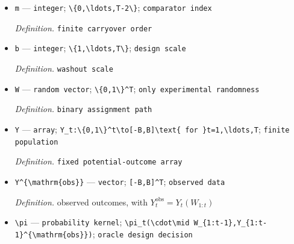 \documentclass{article}
\begin{document}
\begin{itemize}
  \par\smallskip\noindent\emph{Definition.} \texttt{polynomial historical-\allowbreak{}decay index}
  \item \texttt{m} --- \texttt{integer}; \texttt{\textbackslash{}\allowbreak{}\{0,\allowbreak{}\textbackslash{}\allowbreak{}ldots,\allowbreak{}T-\allowbreak{}2\textbackslash{}\allowbreak{}\}\allowbreak{}}; \texttt{comparator index}
  \par\smallskip\noindent\emph{Definition.} \texttt{finite carryover order}
  \item \texttt{b} --- \texttt{integer}; \texttt{\textbackslash{}\allowbreak{}\{1,\allowbreak{}\textbackslash{}\allowbreak{}ldots,\allowbreak{}T\textbackslash{}\allowbreak{}\}\allowbreak{}}; \texttt{design scale}
  \par\smallskip\noindent\emph{Definition.} \texttt{washout scale}
  \item \texttt{W} --- \texttt{random vector}; \texttt{\textbackslash{}\allowbreak{}\{0,\allowbreak{}1\textbackslash{}\allowbreak{}\}\allowbreak{}\textasciicircum{}T}; \texttt{only experimental randomness}
  \par\smallskip\noindent\emph{Definition.} \texttt{binary assignment path}
  \item \texttt{Y} --- \texttt{array}; \texttt{Y\_\allowbreak{}t:\allowbreak{}\textbackslash{}\allowbreak{}\{0,\allowbreak{}1\textbackslash{}\allowbreak{}\}\allowbreak{}\textasciicircum{}t\textbackslash{}\allowbreak{}to[-\allowbreak{}B,\allowbreak{}B]\textbackslash{}\allowbreak{}text\{ for \}\allowbreak{}t=\allowbreak{}1,\allowbreak{}\textbackslash{}\allowbreak{}ldots,\allowbreak{}T}; \texttt{finite population}
  \par\smallskip\noindent\emph{Definition.} \texttt{fixed potential-\allowbreak{}outcome array}
  \item \texttt{Y\textasciicircum{}\{\textbackslash{}\allowbreak{}mathrm\{obs\}\allowbreak{}\}\allowbreak{}} --- \texttt{vector}; \texttt{[-\allowbreak{}B,\allowbreak{}B]\textasciicircum{}T}; \texttt{observed data}
  \par\smallskip\noindent\emph{Definition.} observed outcomes, with \(Y_t^{\mathrm{obs}}=Y_t(W_{1:t})\)
  \item \texttt{\textbackslash{}\allowbreak{}pi} --- \texttt{probability kernel}; \texttt{\textbackslash{}\allowbreak{}pi\_\allowbreak{}t(\textbackslash{}\allowbreak{}cdot\textbackslash{}\allowbreak{}mid W\_\allowbreak{}\{1:\allowbreak{}t-\allowbreak{}1\}\allowbreak{},\allowbreak{}Y\_\allowbreak{}\{1:\allowbreak{}t-\allowbreak{}1\}\allowbreak{}\textasciicircum{}\{\textbackslash{}\allowbreak{}mathrm\{obs\}\allowbreak{}\}\allowbreak{})}; \texttt{oracle design decision}

\end{itemize}
\end{document}
